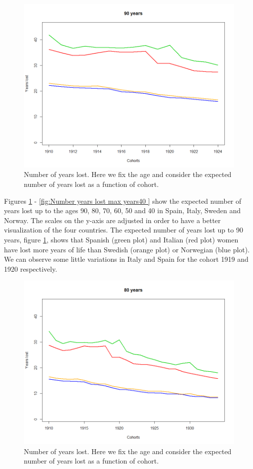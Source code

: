               \begin{figure}[tbh]
             \centering
              \includegraphics[width=0.8\linewidth]{figures/antal_tapteAA_age90.png}
              \caption{Number of years lost. Here we fix the age and consider the expected number of years lost as a function of cohort.}
              \label{fig:Number years lost max years90}
              \end{figure}          
Figures \ref{fig:Number years lost max years90} - \ref{fig:Number years lost max years40 } show the expected number of years lost up to the ages 90, 80, 70, 60, 50 and 40 in Spain, Italy, Sweden and Norway.
The scales on the y-axis are adjusted in order to have a better visualization of the four countries.
The expected number of years lost up to 90 years, figure \ref{fig:Number years lost max years90}, shows that Spanish (green plot) and Italian (red plot) women have lost more years of life than Swedish (orange plot) or Norwegian (blue plot).
We can observe some little variations in Italy and Spain for the cohort 1919 and 1920 respectively.
 
            
            
                            
              \begin{figure}[tbh]
             \centering
              \includegraphics[width=0.8\linewidth]{figures/antal_tapteAA_age80.png}
              \caption{Number of years lost. Here we fix the age and consider the expected number of years lost as a function of cohort.}
              \label{fig:Number years lost max years80}
            \end{figure}          
                    

